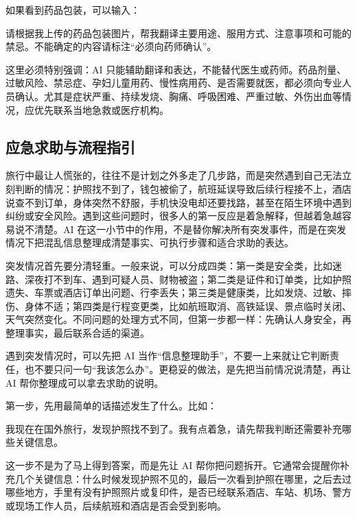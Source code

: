 如果看到药品包装，可以输入：

\begin{tcolorbox}[promptbox]
请根据我上传的药品包装图片，帮我翻译主要用途、服用方式、注意事项和可能的禁忌。不能确定的内容请标注“必须向药师确认”。
\end{tcolorbox}

这里必须特别强调：AI 只能辅助翻译和表达，不能替代医生或药师。药品剂量、过敏风险、禁忌症、孕妇儿童用药、慢性病用药、是否需要就医，都必须向专业人员确认。尤其是症状严重、持续发烧、胸痛、呼吸困难、严重过敏、外伤出血等情况，应优先联系当地急救或医疗机构。

\subsection{应急求助与流程指引}

旅行中最让人慌张的，往往不是计划之外多走了几步路，而是突然遇到自己无法立刻判断的情况：护照找不到了，钱包被偷了，航班延误导致后续行程接不上，酒店说查不到订单，身体突然不舒服，手机快没电却还要找路，甚至在陌生环境中遇到纠纷或安全风险。遇到这些问题时，很多人的第一反应是着急解释，但越着急越容易说不清楚。AI 在这一小节中的作用，不是替你解决所有突发事件，而是在突发情况下把混乱信息整理成清楚事实、可执行步骤和适合求助的表达。

突发情况首先要分清轻重。一般来说，可以分成四类：第一类是安全类，比如迷路、深夜打不到车、遇到可疑人员、财物被盗；第二类是证件和订单类，比如护照遗失、车票或酒店订单出问题、行李丢失；第三类是健康类，比如发烧、过敏、摔伤、身体不适；第四类是行程变更类，比如航班取消、高铁延误、景点临时关闭、天气突然变化。不同问题的处理方式不同，但第一步都一样：先确认人身安全，再整理事实，最后联系合适的渠道。

遇到突发情况时，可以先把 AI 当作“信息整理助手”，不要一上来就让它判断责任，也不要只问一句“我该怎么办”。更稳妥的做法，是先把当前情况说清楚，再让 AI 帮你整理成可以拿去求助的说明。

第一步，先用最简单的话描述发生了什么。比如：

\begin{tcolorbox}[promptbox]
我现在在国外旅行，发现护照找不到了。我有点着急，请先帮我判断还需要补充哪些关键信息。
\end{tcolorbox}

这一步不是为了马上得到答案，而是先让 AI 帮你把问题拆开。它通常会提醒你补充几个关键信息：什么时候发现护照不见的，最后一次看到护照在哪里，之后去过哪些地方，手里有没有护照照片或复印件，是否已经联系酒店、车站、机场、警方或现场工作人员，后续航班和酒店是否会受到影响。

